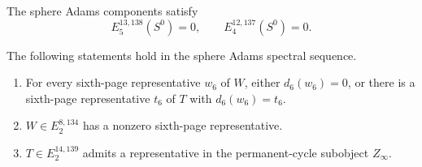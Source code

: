 \begin{theorem}
\label{frontier:AdamsCalculations:117e697ada3f}
The sphere Adams components satisfy
\[E_5^{13,138}(S^0)=0,\qquad E_4^{12,137}(S^0)=0.\]

The following statements hold in the sphere Adams spectral sequence.
\begin{enumerate}
\item For every sixth-page representative $w_6$ of $W$, either $d_6(w_6)=0$, or there is a sixth-page representative $t_6$ of $T$ with $d_6(w_6)=t_6$.
\item $W\in E_2^{8,134}$ has a nonzero sixth-page representative.
\item $T\in E_2^{14,139}$ admits a representative in the permanent-cycle subobject $Z_\infty$.
\end{enumerate}

\end{theorem}
